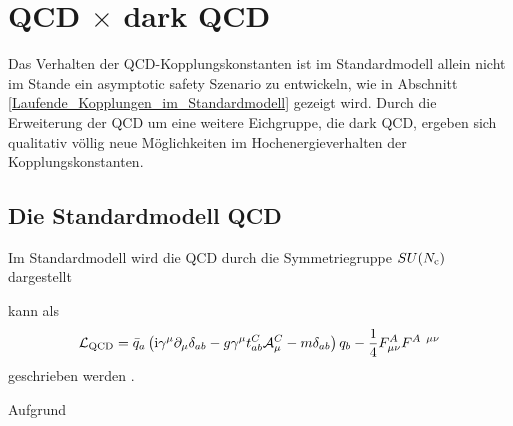\clearpage
\section{QCD $\times$ dark QCD}
  
  Das Verhalten der QCD-Kopplungskonstanten ist im Standardmodell allein nicht 
  im Stande ein asymptotic safety Szenario zu entwickeln, wie in Abschnitt 
  \ref{Laufende_Kopplungen_im_Standardmodell} gezeigt wird. Durch die 
  Erweiterung der QCD um eine weitere Eichgruppe, die dark QCD, ergeben sich 
  qualitativ völlig neue Möglichkeiten im Hochenergieverhalten der 
  Kopplungskonstanten. 
  
  \subsection{Die Standardmodell QCD}
    Im Standardmodell wird die QCD durch die Symmetriegruppe $SU(N_\text{c})$ 
    dargestellt
    
    
    kann als 
    \begin{equation}
     \mathcal{L}_\text{QCD} = \bar{q}_a \left( 
     \text{i} \gamma^\mu \partial_\mu \delta_{ab} 
     -g \gamma^\mu t^C_{ab} \mathcal{A}_\mu^C
     -m \delta_{ab}
     \right)q_b -\frac{1}{4} F_{\mu \nu}^A F^{A \,\,\, \mu\nu}
    \end{equation}
    geschrieben werden \cite{PDG:QCD}. 
    
  
  
  
  
  Aufgrund\cite{Ade:2015xua}